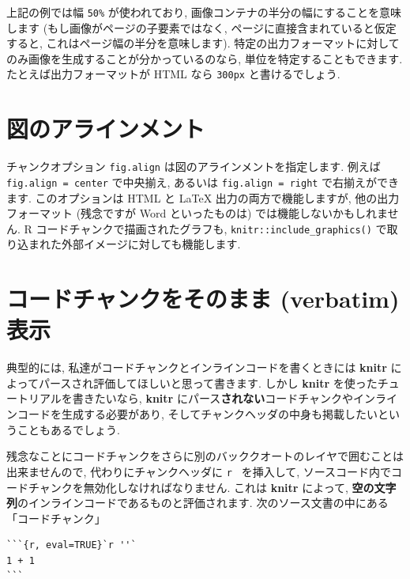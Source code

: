 \documentclass[
  11pt,
  lualatex,ja=standard,jafont=noto]{bxjsreport}
\begin{document}
上記の例では幅 \texttt{50\%} が使われており, 画像コンテナの半分の幅にすることを意味します (もし画像がページの子要素ではなく, ページに直接含まれていると仮定すると, これはページ幅の半分を意味します). 特定の出力フォーマットに対してのみ画像を生成することが分かっているのなら, 単位を特定することもできます. たとえば出力フォーマットが HTML なら \texttt{300px} と書けるでしょう.

\hypertarget{fig-align}{%
\section{図のアラインメント}\label{fig-align}}

チャンクオプション \texttt{fig.align} は図のアラインメントを指定します. 例えば \texttt{fig.align = \textquotesingle{}center\textquotesingle{}} で中央揃え, あるいは \texttt{fig.align = \textquotesingle{}right\textquotesingle{}} で右揃えができます. このオプションは HTML と LaTeX 出力の両方で機能しますが, 他の出力フォーマット (残念ですが Word といったものは) では機能しないかもしれません. R コードチャンクで描画されたグラフも, \texttt{knitr::include\_graphics()} で取り込まれた外部イメージに対しても機能します.

\hypertarget{verbatim-code-chunks}{%
\section{コードチャンクをそのまま (verbatim) 表示}\label{verbatim-code-chunks}}

典型的には, 私達がコードチャンクとインラインコードを書くときには \textbf{knitr} によってパースされ評価してほしいと思って書きます. しかし \textbf{knitr} を使ったチュートリアルを書きたいなら, \textbf{knitr} にパース\textbf{されない}コードチャンクやインラインコードを生成する必要があり, そしてチャンクヘッダの中身も掲載したいということもあるでしょう.

残念なことにコードチャンクをさらに別のバッククオートのレイヤで囲むことは出来ませんので, 代わりにチャンクヘッダに \texttt{\textasciigrave{}r\ \textquotesingle{}\textquotesingle{}\textasciigrave{}} を挿入して, ソースコード内でコードチャンクを無効化しなければなりません. これは \textbf{knitr} によって, \textbf{空の文字列}のインラインコードであるものと評価されます. 次のソース文書の中にある「コードチャンク」

\begin{verbatim}
```{r, eval=TRUE}`r ''`
1 + 1
```
\end{verbatim}
\end{document}
